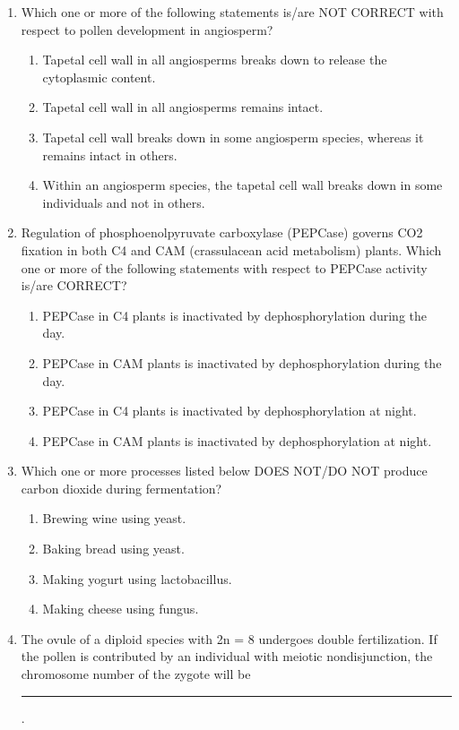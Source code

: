\documentclass[journal,12pt,onecolumn]{IEEEtran}
\begin{document}
\begin{enumerate}
    \item Which one or more of the following statements is/are NOT CORRECT with respect to pollen development in angiosperm?
    \begin{enumerate}
        \item Tapetal cell wall in all angiosperms breaks down to release the cytoplasmic content.
        \item Tapetal cell wall in all angiosperms remains intact.
        \item Tapetal cell wall breaks down in some angiosperm species, whereas it remains intact in others.
        \item Within an angiosperm species, the tapetal cell wall breaks down in some individuals and not in others.
    \end{enumerate}

    \item Regulation of phosphoenolpyruvate carboxylase (PEPCase) governs CO2 fixation in both C4 and CAM (crassulacean acid metabolism) plants. Which one or more of the following statements with respect to PEPCase activity is/are CORRECT?
    \begin{enumerate}
        \item PEPCase in C4 plants is inactivated by dephosphorylation during the day.
        \item PEPCase in CAM plants is inactivated by dephosphorylation during the day.
        \item PEPCase in C4 plants is inactivated by dephosphorylation at night.
        \item PEPCase in CAM plants is inactivated by dephosphorylation at night.
    \end{enumerate}

    \item Which one or more processes listed below DOES NOT/DO NOT produce carbon dioxide during fermentation?
    \begin{enumerate}
        \item Brewing wine using yeast.
        \item Baking bread using yeast.
        \item Making yogurt using lactobacillus.
        \item Making cheese using fungus.
    \end{enumerate}

    \item The ovule of a diploid species with 2n = 8 undergoes double fertilization. If the pollen is contributed by an individual with meiotic nondisjunction, the chromosome number of the zygote will be \rule{1 cm}{0.15 mm}.


\end{enumerate}
\end{document}
